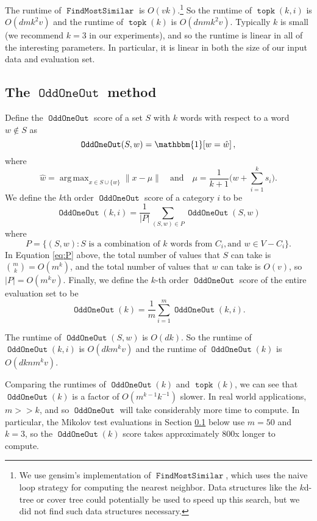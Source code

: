 \documentclass[11pt]{article}
\newcommand{\ltwo}[1]{\lVert{#1}\rVert}
\newcommand{\indicator}[1]{\mathbbm{1}\!\left[{#1}\right]}
\DeclareMathOperator*{\argmax}{arg\,max}
\DeclareMathOperator{\FindMostSimilar}{\texttt{FindMostSimilar}}
\DeclareMathOperator{\OddOneOut}{\texttt{OddOneOut}}
\DeclareMathOperator{\topk}{\texttt{topk}}
\begin{document}
The runtime of $\FindMostSimilar$ is $O(vk)$.\footnote{
    We use gensim's implementation of $\FindMostSimilar$,
    which uses the naive loop strategy for computing the nearest neighbor.
    Data structures like the $k$d-tree or cover tree could potentially be used to speed up this search,
    but we did not find such data structures necessary.
}
So the runtime of $\topk(k,i)$ is $O(dmk^2v)$
and the runtime of $\topk(k)$ is $O(dnmk^2v)$.
Typically $k$ is small (we recommend $k=3$ in our experiments),
and so the runtime is linear in all of the interesting parameters.
In particular, it is linear in both the size of our input data and evaluation set.

\subsection{The $\OddOneOut$ method}
Define the $\OddOneOut$ score of a set $S$ with $k$ words with respect to a word $w\not\in S$ as
\begin{equation}
    \OddOneOut(S,w) = \indicator{w = \hat w},
\end{equation}
where
\begin{equation}
    \hat w = \argmax_{x \in S\cup\{w\}} \ltwo{x - \mu}
    \quad
    \text{and}
    \quad
    \mu = \frac1{k+1}\bigg(w + \sum_{i=1}^k{s_i}\bigg)
    .
\end{equation}
We define the $k$th order $\OddOneOut$ score of a category $i$ to be
\begin{equation}
    \OddOneOut(k,i) = \frac 1 {|P|} \sum_{(S,w) \in P} \OddOneOut(S,w)
\end{equation}
where
\begin{equation}
    P = \{ (S, w) : S \text{~is a combination of $k$ words from $C_i$}, \text{and~} w \in V-C_i \}
    .
    \label{eq:P}
\end{equation}
In Equation \eqref{eq:P} above,
the total number of values that $S$ can take is ${m \choose k} = O(m^k)$,
and the total number of values that $w$ can take is $O(v)$,
so $|P| = O(m^kv)$.
Finally, we define the $k$-th order $\OddOneOut$ score of the entire evaluation set to be
\begin{equation}
    \OddOneOut(k) = \frac 1 m \sum_{i=1}^m \OddOneOut(k,i)
    .
\end{equation}

The runtime of $\OddOneOut(S,w)$ is $O(dk)$.
So the runtime of $\OddOneOut(k,i)$ is $O(dkm^kv)$ and the runtime of $\OddOneOut(k)$ is $O(dknm^kv)$.

Comparing the runtimes of $\OddOneOut(k)$ and $\topk(k)$, we can see that $\OddOneOut(k)$ is a factor of $O(m^{k-1}k^{-1})$ slower.
In real world applications, $m >\!\!> k$, and so $\OddOneOut$ will take considerably more time to compute.
In particular, the Mikolov test evaluations in Section \ref{} below use $m=50$ and $k=3$,
so the $\OddOneOut(k)$ score takes approximately 800x longer to compute.
\end{document}
